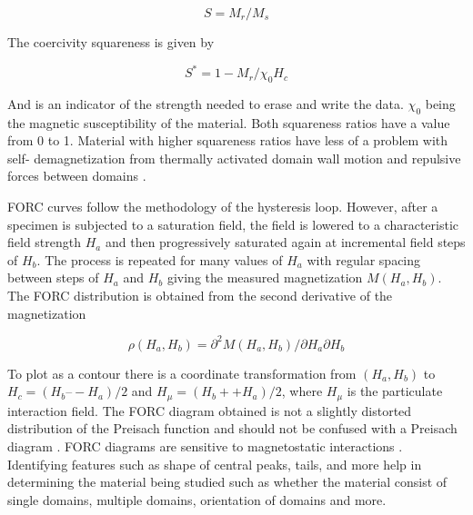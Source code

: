 \documentclass[aps,twocolumn,groupedaddress]{revtex4}
\begin{document}
\begin{equation}
S= M_r / M_s
\label{squareness}
\end{equation}	

The coercivity squareness is given by

\begin{equation}
S^* = 1- M_r / \chi_0 H_c
\label{coercivesquareness}
\end{equation}	

And is an indicator of the strength needed to erase and write the data. $\chi_0$ being the magnetic susceptibility of the material. Both squareness ratios have a value from 0 to 1. Material with higher squareness ratios have less of a problem with self- demagnetization from thermally activated domain wall motion and repulsive forces between domains \cite{NAKAGAWA}. 

FORC curves follow the methodology of the hysteresis loop. However, after a specimen is subjected to a saturation field, the field is lowered to a characteristic field strength $H_a$ and then progressively saturated again at incremental field steps of $H_b$. The process is repeated for many values of $H_a$ with regular spacing between steps of $H_a$ and $H_b$ giving the measured magnetization $M(H_a, H_b)$. The FORC distribution is obtained from the second derivative of the magnetization

\begin{equation}
\rho(H_a, H_b ) =\partial^2 M(H_a , H_b )/ \partial H_a \partial H_b 
\label{coercivesquareness}
\end{equation}

To plot as a contour there is a coordinate transformation from $(H_a, H_b)$ to $H_c = (H_b –- H_a)/2$ and $H_\mu = (H_b ++ H_a)/2$, where $H_\mu$ is the particulate interaction field. The FORC diagram obtained is not a slightly distorted distribution of the Preisach function and should not be confused with a Preisach diagram \cite{DOBROTA}. FORC diagrams are sensitive to magnetostatic interactions \cite{MUXWORTHY}. Identifying features such as shape of central peaks, tails, and more help in determining the material being studied such as whether the material consist of single domains, multiple domains, orientation of domains and more.
\end{document}
